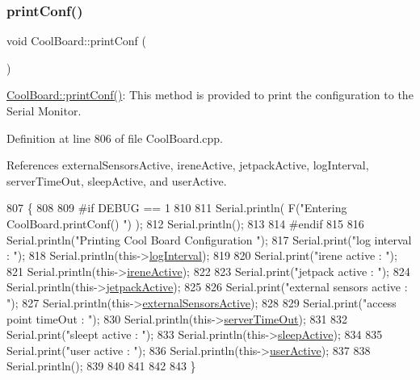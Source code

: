\mbox{\label{classCoolBoard_a486507b8f0981d3cc671ed31c2145755}} 
\subsubsection{\texorpdfstring{print\+Conf()}{printConf()}}
{\footnotesize\ttfamily void Cool\+Board\+::print\+Conf (\begin{DoxyParamCaption}{ }\end{DoxyParamCaption})}

\hyperlink{classCoolBoard_a486507b8f0981d3cc671ed31c2145755}{Cool\+Board\+::print\+Conf()}\+: This method is provided to print the configuration to the Serial Monitor. 

Definition at line 806 of file Cool\+Board.\+cpp.



References external\+Sensors\+Active, irene\+Active, jetpack\+Active, log\+Interval, server\+Time\+Out, sleep\+Active, and user\+Active.


\begin{DoxyCode}
807 \{
808 
809 \textcolor{preprocessor}{#if DEBUG == 1}
810     
811     Serial.println( F(\textcolor{stringliteral}{"Entering CoolBoard.printConf() "}) );
812     Serial.println();
813 
814 \textcolor{preprocessor}{#endif}
815 
816     Serial.println(\textcolor{stringliteral}{"Printing Cool Board Configuration "});
817     Serial.print(\textcolor{stringliteral}{"log interval      : "});
818     Serial.println(this->\hyperlink{classCoolBoard_a84bc94413b64973e4aba8c467c97006c}{logInterval});
819 
820     Serial.print(\textcolor{stringliteral}{"irene active      : "});
821     Serial.println(this->\hyperlink{classCoolBoard_a9c3f7ac625481ee2ae802a25d97a4ae0}{ireneActive});
822 
823     Serial.print(\textcolor{stringliteral}{"jetpack active        : "});
824     Serial.println(this->\hyperlink{classCoolBoard_a9be03a913d26e558328935ca3b59a75e}{jetpackActive});
825 
826     Serial.print(\textcolor{stringliteral}{"external sensors active   : "});
827     Serial.println(this->\hyperlink{classCoolBoard_a638b00b76aeb819ecfd4c10b8cdd7bb7}{externalSensorsActive});
828 
829     Serial.print(\textcolor{stringliteral}{"access point timeOut  : "});
830     Serial.println(this->\hyperlink{classCoolBoard_a7a8d8d3d316220cdd049cd63c1aa8fe6}{serverTimeOut});
831 
832     Serial.print(\textcolor{stringliteral}{"sleept active         : "});
833     Serial.println(this->\hyperlink{classCoolBoard_a0a51b2287139f66c738101fb53139230}{sleepActive});
834 
835     Serial.print(\textcolor{stringliteral}{"user active       : "});
836     Serial.println(this->\hyperlink{classCoolBoard_a6395459131d6889a3005f79c7a35e964}{userActive});
837 
838     Serial.println();
839 
840 
841 
842 
843 \}
\end{DoxyCode}
\mbox{\label{classCoolBoard_ad03abdce2e65f520bbf2cff0f2d083cf}} 
